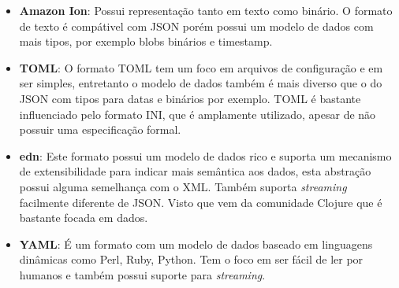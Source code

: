 \begin{itemize}
    \item \textbf{Amazon Ion}: Possui representação tanto em texto como binário. O formato de texto
    é compátivel com JSON porém possui um modelo de dados com mais tipos, por exemplo blobs binários e
    timestamp.
    \item \textbf{TOML}: O formato TOML tem um foco em arquivos de configuração e em ser simples, 
    entretanto o modelo de dados também é mais diverso que o do JSON com tipos para datas e binários 
    por exemplo. TOML é bastante influenciado pelo formato INI, que é amplamente utilizado, apesar de não
    possuir uma especificação formal.
    \item \textbf{edn}: Este formato possui um modelo de dados rico e suporta um 
    mecanismo de extensibilidade para indicar mais semântica aos dados, esta abstração possui 
    alguma semelhança com o XML. Também suporta \textit{streaming} facilmente diferente de JSON.
    Visto que vem da comunidade Clojure que é bastante focada em dados.
    \item \textbf{YAML}: É um formato com um modelo de dados baseado em linguagens dinâmicas
    como Perl, Ruby, Python. Tem o foco em ser fácil de ler por humanos e também possui suporte
    para \textit{streaming}.
\end{itemize}